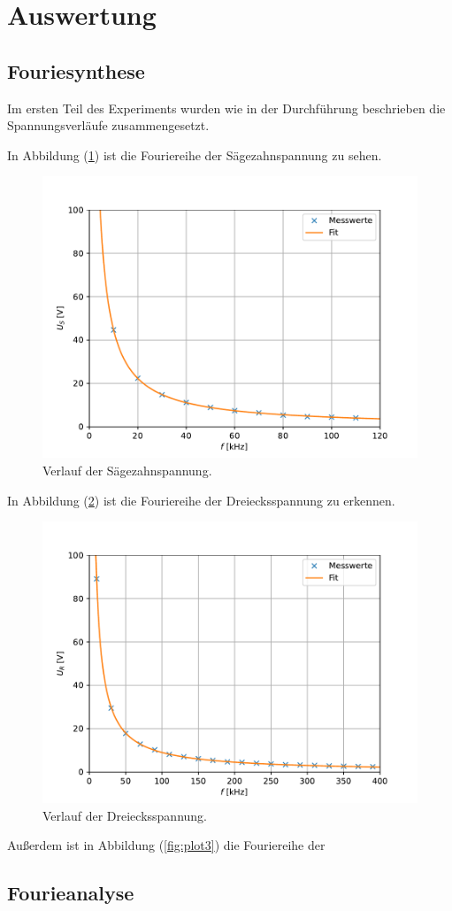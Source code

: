\section{Auswertung}
\label{sec:Auswertung}

\subsection{Fouriesynthese}
Im ersten Teil des Experiments wurden wie in der Durchführung beschrieben die Spannungsverläufe zusammengesetzt. 

In Abbildung (\ref{fig:plot1}) ist die Fouriereihe der Sägezahnspannung zu sehen.
\begin{figure}[H]
  \centering
  \includegraphics{plot1.pdf}
  \caption{Verlauf der Sägezahnspannung.}
  \label{fig:plot1}
\end{figure}

In Abbildung (\ref{fig:plot2}) ist die Fouriereihe der Dreiecksspannung zu erkennen. 
\begin{figure}[H]
  \centering
  \includegraphics{plot2.pdf}
  \caption{Verlauf der Dreiecksspannung.}
  \label{fig:plot2}
\end{figure}

Außerdem ist in Abbildung (\ref{fig:plot3}) die Fouriereihe der 

\subsection{Fourieanalyse}



